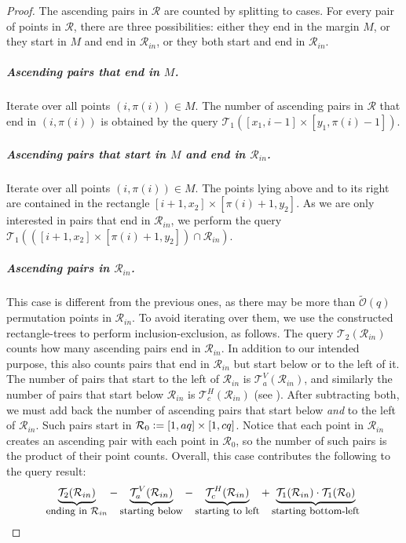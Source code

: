 \documentclass{article}
\newcommand{\eqdef}{\vcentcolon=}
\theoremstyle{remark}
\newcommand{\Otilde}[1]{\widetilde{\mathcal{O}}\left( #1 \right)}
\theoremstyle{plain}
\begin{document}
\begin{proof}
    The ascending pairs in $\mathcal{R}$ are counted by splitting to cases.
    For every pair of points in $\mathcal{R}$, there are three possibilities:
    either they end in the margin $M$, or they start in $M$ and end in $\mathcal{R}_{in}$, or they both start and end in $\mathcal{R}_{in}$.

    \subparagraph{Ascending pairs that end in $M$.}
    Iterate over all points $(i,\pi(i))\in M$. The number of ascending pairs in $\mathcal{R}$ that end in $(i,\pi(i))$ is obtained by the query $\mathcal{T}_1([x_1,i-1] \times [y_1, \pi(i)-1])$.

    \subparagraph{Ascending pairs that start in $M$ and end in $\mathcal{R}_{in}$.}
    Iterate over all points $(i,\pi(i))\in M$. The points lying above and to its right
    are contained in the rectangle $[i+1,x_2] \times [\pi(i)+1,y_2]$.
    As we are only interested in pairs that end in $\mathcal{R}_{in}$,
    we perform the query $\mathcal{T}_1(([i+1,x_2]\times [\pi(i)+1,y_2])\cap \mathcal{R}_{in})$.

    \subparagraph{Ascending pairs in $\mathcal{R}_{in}$.}
    This case is different from the previous ones, as there may be more than $\Otilde{q}$ permutation points in $\mathcal{R}_{in}$.
    To avoid iterating over them, we use the constructed rectangle-trees to perform inclusion-exclusion, as follows.
    The query $\mathcal{T}_2(\mathcal{R}_{in})$ counts how many ascending pairs end in $\mathcal{R}_{in}$.
    In addition to our intended purpose, this also counts pairs that end in $\mathcal{R}_{in}$ but start below or to the left of it.
    The number of pairs that start to the left of $\mathcal{R}_{in}$ is $\mathcal{T}^V_a(\mathcal{R}_{in})$,
    and similarly the number of pairs that start below $\mathcal{R}_{in}$ is $\mathcal{T}^H_c(\mathcal{R}_{in})$ (see ). After subtracting both, we must add back the number of ascending pairs that start below \emph{and} to the left of $\mathcal{R}_{in}$.
    Such pairs start in $\mathcal{R}_0 \eqdef [1, aq] \times [1, cq]$.
    Notice that each point in $\mathcal{R}_{in}$ creates an ascending pair with each point in $\mathcal{R}_0$,
    so the number of such pairs is the product of their point counts.
    Overall, this case contributes the following to the query result:
    \[
    \underbrace{\mathcal{T}_2(\mathcal{R}_{in})}_{\text{\small ending in $\mathcal{R}_{in}$}}
    -
    \underbrace{\mathcal{T}^V_a(\mathcal{R}_{in})}_{\text{\small starting below}}
    -
    \underbrace{\mathcal{T}^H_c(\mathcal{R}_{in})}_{\text{\small starting to left}}
    +
    \underbrace{\mathcal{T}_1(\mathcal{R}_{in}) \cdot \mathcal{T}_1(\mathcal{R}_0)}_{\text{\small starting bottom-left}} \qedhere
    \]
\end{proof}
\end{document}
